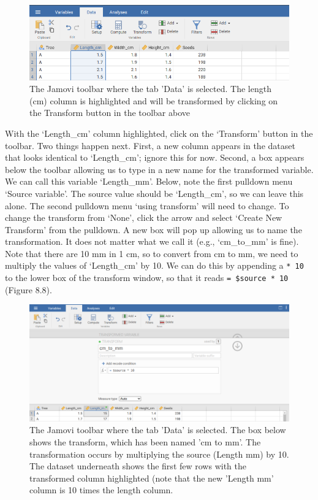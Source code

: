\documentclass[
]{scrbook}
\begin{document}
\begin{figure}
\includegraphics[width=1\linewidth]{img/jamovi_transform_fig_length} \caption{The Jamovi toolbar where the tab 'Data' is selected. The length (cm) column is highlighted and will be transformed by clicking on the Transform button in the toolbar above}\label{fig:unnamed-chunk-31}
\end{figure}

With the `Length\_cm' column highlighted, click on the `Transform' button in the toolbar.
Two things happen next.
First, a new column appears in the dataset that looks identical to `Length\_cm'; ignore this for now.
Second, a box appears below the toolbar allowing us to type in a new name for the transformed variable.
We can call this variable `Length\_mm'.
Below, note the first pulldown menu `Source variable'.
The source value should be `Length\_cm', so we can leave this alone.
The second pulldown menu `using transform' will need to change.
To change the transform from `None', click the arrow and select `Create New Transform' from the pulldown.
A new box will pop up allowing us to name the transformation.
It does not matter what we call it (e.g., `cm\_to\_mm' is fine).
Note that there are 10 mm in 1 cm, so to convert from cm to mm, we need to multiply the values of `Length\_cm' by 10.
We can do this by appending a \texttt{*\ 10} to the lower box of the transform window, so that it reads \texttt{=\ \$source\ *\ 10} (Figure 8.8).

\begin{figure}
\includegraphics[width=1\linewidth]{img/jamovi_transform_cm_to_mm} \caption{The Jamovi toolbar where the tab 'Data' is selected. The box below shows the transform, which has been named 'cm to mm'. The transformation occurs by multiplying the source (Length mm) by 10. The dataset underneath shows the first few rows with the transformed column highlighted (note that the new 'Length mm' column is 10 times the length column.}\label{fig:unnamed-chunk-32}
\end{figure}
\end{document}
